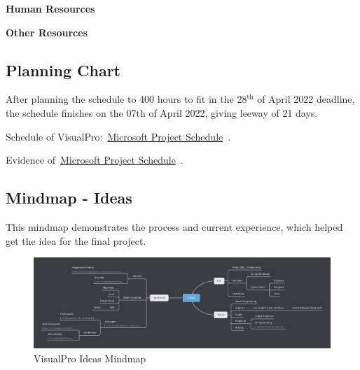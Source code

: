 \documentclass[conference]{IEEEtran}
\begin{document}
        \textbf{Human Resources}

        \textbf{Other Resources}
      \subsection{Planning Chart}
      \label{subsec:rp-planningChart}
        After planning the schedule to 400 hours to fit in the 28$^{\text{th}}$ of April 2022 deadline, the schedule finishes on the 07${\text{th}}$ of April 2022, giving leeway of 21 days. 

        Schedule of VisualPro:~\href{https://github.com/ShinkuKira21/VisualPro-FinalProject/blob/main/Project/VisualPro.mpp?raw=true}{Microsoft Project Schedule}~\cite{patch_visualpro_2021}.
        
        Evidence of~\href{https://github.com/ShinkuKira21/VisualPro-FinalProject/blob/main/Project/Plan.docx?raw=true}{Microsoft Project Schedule}~\cite{patch_visualpro_2021-1}.


      \begin{landscape}
        \thispagestyle{fancylandscape}
        \subsection{Mindmap - Ideas}
        This mindmap demonstrates the process and current experience, which helped get the idea for the final project.
        \begin{figure}[h]
          \includegraphics[height=.83\textheight, width=1.30\textwidth]{Figures/mindmap-ideas.png}
          \caption{VisualPro Ideas Mindmap}
        \end{figure}
      \end{landscape}
\end{document}
